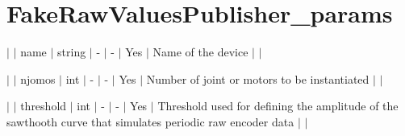 \chapter{Fake\+Raw\+Values\+Publisher\+\_\+params }
\hypertarget{md_icub-main_2src_2libraries_2icubmod_2fakeRawValuesPublisher_2FakeRawValuesPublisher__params}{}\label{md_icub-main_2src_2libraries_2icubmod_2fakeRawValuesPublisher_2FakeRawValuesPublisher__params}

\begin{DoxyItemize}
\item \texorpdfstring{$\vert$}{|} \texorpdfstring{$\vert$}{|} name \texorpdfstring{$\vert$}{|} string \texorpdfstring{$\vert$}{|} -\/ \texorpdfstring{$\vert$}{|} -\/ \texorpdfstring{$\vert$}{|} Yes \texorpdfstring{$\vert$}{|} Name of the device \texorpdfstring{$\vert$}{|} \texorpdfstring{$\vert$}{|}
\item \texorpdfstring{$\vert$}{|} \texorpdfstring{$\vert$}{|} njomos \texorpdfstring{$\vert$}{|} int \texorpdfstring{$\vert$}{|} -\/ \texorpdfstring{$\vert$}{|} -\/ \texorpdfstring{$\vert$}{|} Yes \texorpdfstring{$\vert$}{|} Number of joint or motors to be instantiated \texorpdfstring{$\vert$}{|} \texorpdfstring{$\vert$}{|}
\item \texorpdfstring{$\vert$}{|} \texorpdfstring{$\vert$}{|} threshold \texorpdfstring{$\vert$}{|} int \texorpdfstring{$\vert$}{|} -\/ \texorpdfstring{$\vert$}{|} -\/ \texorpdfstring{$\vert$}{|} Yes \texorpdfstring{$\vert$}{|} Threshold used for defining the amplitude of the sawthooth curve that simulates periodic raw encoder data \texorpdfstring{$\vert$}{|} \texorpdfstring{$\vert$}{|} 
\end{DoxyItemize}
